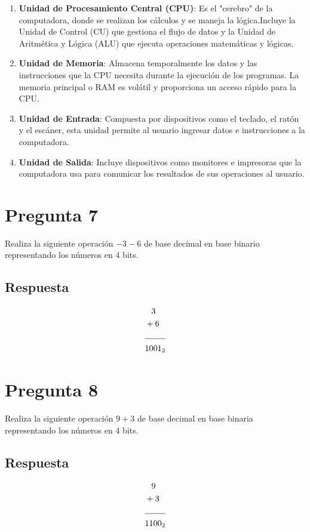 \documentclass{article}
\begin{document}
\begin{enumerate}
    \item \textbf{Unidad de Procesamiento Central (CPU)}: Es el "cerebro" de la computadora, donde se realizan los cálculos y se maneja la lógica.Incluye la Unidad de Control (CU) que gestiona el flujo de datos y la Unidad de Aritmética y Lógica (ALU) que ejecuta operaciones matemáticas y lógicas.
    
    \item \textbf{Unidad de Memoria}: Almacena temporalmente los datos y las instrucciones que la CPU necesita durante la ejecución de los programas. La memoria principal o RAM es volátil y proporciona un acceso rápido para la CPU.
    
    \item \textbf{Unidad de Entrada}: Compuesta por dispositivos como el teclado, el ratón y el escáner, esta unidad permite al usuario ingresar datos e instrucciones a la computadora.
    
    \item \textbf{Unidad de Salida}: Incluye dispositivos como monitores e impresoras que la computadora usa para comunicar los resultados de sus operaciones al usuario.
\end{enumerate}



\section*{Pregunta 7}

Realiza la siguiente operación \(-3 - 6\) de base decimal en base binario representando los
números en 4 bits.

\subsection*{Respuesta}
\begin{align*}
  &\phantom{-}3 \\
  &+6 \\
  \cline{1-2}
  &1001_2
\end{align*}

\section*{Pregunta 8}
Realiza la siguiente operación \(9 + 3\) de base decimal en base binaria representando los números en 4 bits.
\subsection*{Respuesta}
\begin{align*}
  &\phantom{+}9 \\
  &+3 \\
  \cline{1-2}
  &1100_2
\end{align*}
\end{document}
